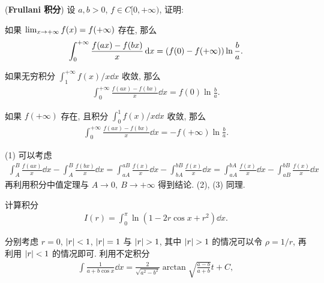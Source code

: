 \begin{exercise}[series=exer]
\begin{hint}
    \end{hint}
    \item (\textbf{Frullani 积分}) 设 $ a, b > 0 $, $ f \in C[0, +\infty) $, 证明:
    \begin{exercise}
        \item  如果 $ \lim_{x \to +\infty}f(x) = f(+\infty) $ 存在, 那么
        \begin{align*}
            \int_{0}^{+\infty} \frac{f(ax) - f(bx)}{x} \dd{x} = \qty(f(0) - f(+\infty))\ln\frac{b}{a}.
        \end{align*}
        \item 如果无穷积分 $ \int_{1}^{+\infty} f(x)/x \dd{x} $ 收敛, 那么
        \begin{align*}
            \int_{0}^{+\infty} \frac{f(ax) - f(bx)}{x} \dd{x} = f(0)\ln\frac{b}{a}.
        \end{align*}
        \item 如果 $ f(+\infty) $ 存在, 且积分 $ \int_{0}^{1} f(x)/x \dd{x} $ 收敛, 那么
        \begin{align*}
            \int_{0}^{+\infty} \frac{f(ax) - f(bx)}{x} \dd{x} = - f(+\infty)\ln\frac{b}{a}.
        \end{align*}
    \end{exercise}
    \begin{hint}
        (1) 可以考虑
        \begin{align*}
            \int_{A}^{B} \frac{f(ax)}{x} \dd{x} - \int_{A}^{B} \frac{f(bx)}{x} \dd{x} = \int_{aA}^{aB} \frac{f(x)}{x} \dd{x} - \int_{bA}^{bB} \frac{f(x)}{x} \dd{x} = \int_{aA}^{bA} \frac{f(x)}{x} \dd{x} - \int_{aB}^{bB} \frac{f(x)}{x} \dd{x}
        \end{align*}
        再利用积分中值定理与 $ A \to 0,\ B \to +\infty $ 得到结论. (2), (3) 同理.
    \end{hint}
    \item 计算积分
    \begin{align*}
        I(r) = \int_{0}^{\pi} \ln(1 - 2 r \cos x + r^{2}) \dd{x}.
    \end{align*}
    \begin{hint}
        分别考虑 $ r = 0 $, $ \abs{r} < 1 $, $ \abs{r} = 1 $ 与 $ \abs{r} > 1 $, 其中 $ \abs{r} > 1 $ 的情况可以令 $ \rho = 1/r $, 再利用 $ \abs{r} < 1 $ 的情况即可. 
        利用不定积分
        \begin{align*}
            \int \frac{1}{a + b\cos x} \dd{x} = \frac{2}{\sqrt{a^{2} - b^{2}}}\arctan\sqrt{\frac{a - b}{a + b}}t + C,
        \end{align*}

\end{hint}
\end{exercise}
